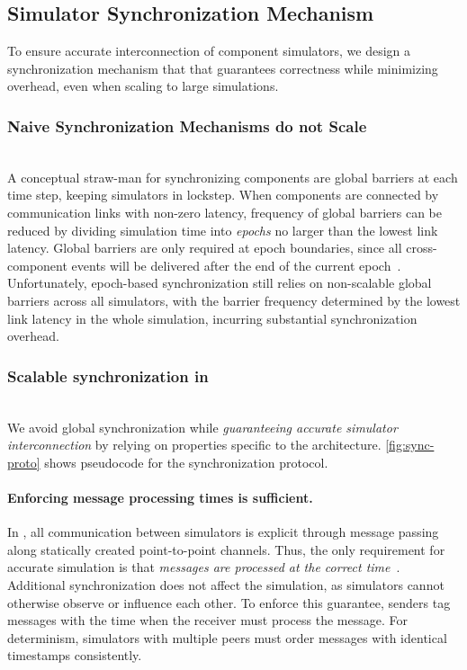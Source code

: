 \subsection{Simulator Synchronization Mechanism}
\label{ssec:design:syncproto}

To ensure accurate interconnection of component simulators, we design a
synchronization mechanism that that guarantees correctness while minimizing
overhead, even when scaling to large simulations.

\subsubsection{Naive Synchronization Mechanisms do not Scale} \hfill\\
A conceptual straw-man for synchronizing components are global
barriers at each time step, keeping simulators in lockstep.
%
When components are connected by communication links with non-zero
latency, frequency of global barriers can be reduced by dividing
simulation time into \textit{epochs} no larger than the lowest link
latency.
%
Global barriers are only required at epoch boundaries, since all
cross-component events will be delivered after the end of the
current epoch~\cite{reinhardt:wwt,mohammad:distgem5,alian:pd-gem5}.
%
Unfortunately, epoch-based synchronization still relies on
non-scalable global barriers across all simulators, with the barrier
frequency determined by the lowest link latency in the whole
simulation, incurring substantial synchronization overhead.

\subsubsection{Scalable synchronization in \sysname} \hfill\\
We avoid global synchronization while \textit{guaranteeing accurate
simulator interconnection} by relying on properties specific to the
\sysname architecture.
%
\autoref{fig:sync-proto} shows pseudocode for the \sysname
synchronization protocol.


\paragraph{Enforcing message processing times is sufficient.}
In \sysname, all communication between simulators is explicit through
message passing along statically created point-to-point channels.
%
Thus, the only requirement for accurate simulation is that
\emph{messages are processed at the correct
time}~\cite{chandy:distsim,bryant:distsim}.
%
Additional synchronization does not affect the simulation, as
simulators cannot otherwise observe or influence each other.
%
To enforce this guarantee, senders tag messages with the time when
the receiver must process the message.
%
For determinism, simulators with multiple peers must order messages with
identical timestamps consistently.


